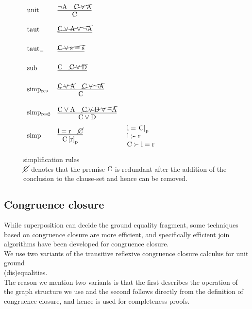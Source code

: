 \begin{figure}
$
\begin{array}[c]{llll}
\m{unit} & \vcenter{\infer[]{\m{C}                            }{\m{\lnot A}  & \cancel{\m{C \lor A}}}} & \parbox[c][1.0cm]{3cm}{}\\
\m{taut} & \vcenter{\infer[]{\m{}                             }{\cancel{\m{C \lor A \lor \lnot A}}}} & \parbox[c][1.0cm]{3cm}{}\\
\m{taut_{=}} & \vcenter{\infer[]{\m{}                             }{\cancel{\m{C \lor s=s}}}} & \parbox[c][1.0cm]{3cm}{}\\
\m{sub} & \vcenter{\infer[]  {\m{}                             }{\m{C} & \cancel{\m{C \lor D}}}} & \parbox[c][1.0cm]{3cm}{}\\
\m{simp_{res}} & \vcenter{\infer[]{\m{C}                      }{\cancel{\m{C \lor A }} & \cancel{\m{C \lor \lnot A}}}} & \parbox[c][1.2cm]{3cm}{}\\
\m{simp_{res2}} & \vcenter{\infer[]{\m{C \lor D}              }{\m{C \lor A } & \cancel{\m{C \lor D \lor \lnot A}}}} & \parbox[c][1.2cm]{3cm}{}\\
\m{simp_{=}} & \vcenter{\infer[]{\m{\termRepAt{C}{r}{p}}}{\m{l=r} & \cancel{\m{C}}}}   &
\parbox[c][1.2cm]{3cm}{\m{l=\termAt{C}{p}}\\\m{l \succ r}\\\m{C \succ l=r}}\\
\end{array}
$
\caption{simplification rules\\
$\cancel{\mathrm{C}}$ denotes that the premise $\mathrm{C}$ is redundant after the addition of the conclusion to the clause-set and hence can be removed.
}
\label{fig_superposition_simp}
\end{figure}

\subsection*{Congruence closure}
While superposition can decide the ground equality fragment, some techniques based on congruence closure are more efficient, 
and specifically efficient join algorithms have been developed for congruence closure.\\
We use two variants of the transitive reflexive congruence closure calculus  for unit ground\\ (dis)equalities.\\
The reason we mention two variants is that the first describes the operation of the graph structure we use and the second follows directly from the definition of congruence closure, and hence is used for completeness proofs.

